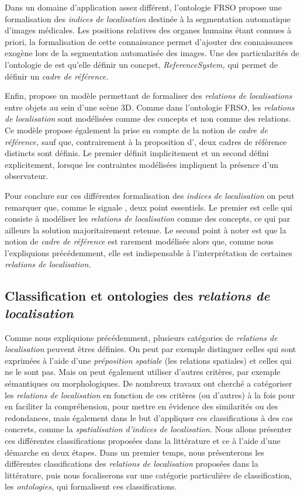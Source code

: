 Dans un domaine d’application assez différent, l'ontologie FRSO
\textcite{Hudelot2008a} propose une formalisation des \emph{indices de
  localisation} destinée à la segmentation automatique d'images
médicales. Les positions relatives des organes humains étant connues à
priori, la formalisation de cette connaissance permet d'ajouter des
connaissances exogène lors de la segmentation automatisée des
images. Une des particularités de l'ontologie de
\textcite{Hudelot2008a} est qu'elle définir un concpet,
\emph{ReferenceSystem,} qui permet de définir un \emph{cadre de
  référence.}

Enfin, \textcite{Trinh2012} propose un modèle permettant de formaliser
des \emph{relations de localisations} entre objets au sein d'une scène
3D. Comme dans l'ontologie FRSO, les \emph{relations de localisation}
sont modélisées comme des concepts et non comme des relations. Ce
modèle propose également la prise en compte de la notion de
\emph{cadre de référence,} sauf que, contrairement à la proposition
d'\textcite{Hudelot2008a}, deux cadres de référence distincts sont
définis. Le premier définit implicitement et un second défini
explicitement, lorsque les contraintes modélisées impliquent la
présence d'un observateur.

Pour conclure sur ces différentes formalisation des \emph{indices de
  localisation} on peut remarquer que, comme le signale
\textcite{Duchene2019}, deux point essentiels. Le premier est celle
qui consiste à modéliser les \emph{relations de localisation} comme
des concepts, ce qui par ailleurs la solution majoritairement
retenue. Le second point à noter est que la notion de \emph{cadre de
  référence} est rarement modélisée alors que, comme nous
l'expliquions précédemment, elle est indispensable à l'interprétation
de certaines \emph{relations de localisation.}

\subsection{Classification et ontologies des \emph{relations de
    localisation}}

Comme nous expliquions précédemment, plusieurs catégories de
\emph{relations de localisation} peuvent êtres définies. On peut par
exemple distinguer celles qui sont exprimées à l'aide d'une
\emph{préposition spatiale} (\ie les relations spatiales) et celles
qui ne le sont pas. Mais on peut également utiliser d'autres critères,
par exemple sémantiques ou morphologiques. De nombreux travaux ont
cherché a catégoriser les \emph{relations de localisation} en fonction
de ces critères (ou d'autres) à la fois pour en faciliter la
compréhension, pour mettre en évidence des similarités ou des
redondances, mais également dans le but d'appliquer ces
classifications à des cas concrets, comme la \emph{spatialisation
  d'indices de localisation.} Nous allons présenter ces différentes
classifications proposées dans la littérature et ce à l'aide d'une
démarche en deux étapes. Dans un premier temps, nous présenterons les
différentes classifications des \emph{relations de localisation}
proposées dans la littérature, puis nous focaliserons sur une
catégorie particulière de classification, les \emph{ontologies,} qui
formalisent ces classifications.

